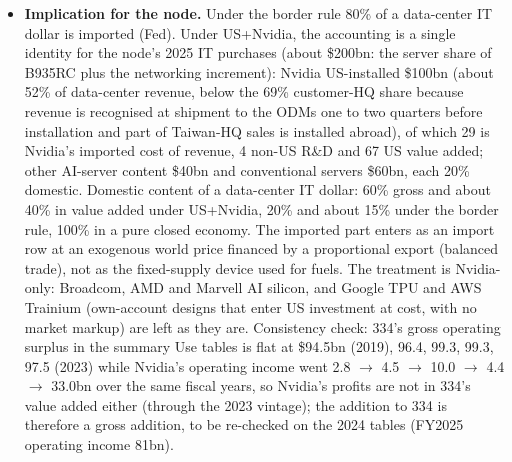 \documentclass[11pt]{article}
\begin{document}
\begin{itemize}
  \item \textbf{Implication for the node.} Under the border rule 80\% of a data-center IT dollar is imported (Fed). Under US+Nvidia, the accounting is a single identity for the node's 2025 IT purchases (about \$200bn: the server share of B935RC plus the networking increment): Nvidia US-installed \$100bn (about 52\% of data-center revenue, below the 69\% customer-HQ share because revenue is recognised at shipment to the ODMs one to two quarters before installation and part of Taiwan-HQ sales is installed abroad), of which 29 is Nvidia's imported cost of revenue, 4 non-US R\&D and 67 US value added; other AI-server content \$40bn and conventional servers \$60bn, each 20\% domestic. Domestic content of a data-center IT dollar: 60\% gross and about 40\% in value added under US+Nvidia, 20\% and about 15\% under the border rule, 100\% in a pure closed economy. The imported part enters as an import row at an exogenous world price financed by a proportional export (balanced trade), not as the fixed-supply device used for fuels. The treatment is Nvidia-only: Broadcom, AMD and Marvell AI silicon, and Google TPU and AWS Trainium (own-account designs that enter US investment at cost, with no market markup) are left as they are. Consistency check: 334's gross operating surplus in the summary Use tables is flat at \$94.5bn (2019), 96.4, 99.3, 99.3, 97.5 (2023) while Nvidia's operating income went 2.8 $\to$ 4.5 $\to$ 10.0 $\to$ 4.4 $\to$ 33.0bn over the same fiscal years, so Nvidia's profits are not in 334's value added either (through the 2023 vintage); the addition to 334 is therefore a gross addition, to be re-checked on the 2024 tables (FY2025 operating income 81bn).
\end{itemize}
\end{document}
